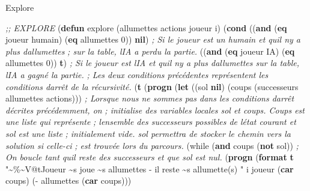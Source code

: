 \documentclass[
]{article}
\newenvironment{Shaded}{}{}
\newcommand{\CommentTok}[1]{\textcolor[rgb]{0.38,0.63,0.69}{\textit{#1}}}
\newcommand{\DecValTok}[1]{\textcolor[rgb]{0.25,0.63,0.44}{#1}}
\newcommand{\FunctionTok}[1]{\textcolor[rgb]{0.02,0.16,0.49}{#1}}
\newcommand{\KeywordTok}[1]{\textcolor[rgb]{0.00,0.44,0.13}{\textbf{#1}}}
\newcommand{\NormalTok}[1]{#1}
\newcommand{\OperatorTok}[1]{\textcolor[rgb]{0.40,0.40,0.40}{#1}}
\newcommand{\StringTok}[1]{\textcolor[rgb]{0.25,0.44,0.63}{#1}}
\begin{document}
\begin{Shaded}
    \begin{algorithm}[H]
        \caption{Explore}
\begin{Highlighting}[]
\CommentTok{;; EXPLORE }
\NormalTok{(}\KeywordTok{defun}\FunctionTok{ explore }\NormalTok{(allumettes actions joueur i)}
\NormalTok{  (}\KeywordTok{cond} 
\NormalTok{   ((}\KeywordTok{and}\NormalTok{ (}\KeywordTok{eq}\NormalTok{ joueur \textquotesingle{}humain) (}\KeywordTok{eq}\NormalTok{ allumettes }\DecValTok{0}\NormalTok{)) }\KeywordTok{nil}\NormalTok{) }
   \CommentTok{; Si le joueur est un humain et qu\textquotesingle{}il n\textquotesingle{}y a plus d\textquotesingle{}allumettes }
   \CommentTok{; sur la table, l\textquotesingle{}IA a perdu la partie.}
\NormalTok{   ((}\KeywordTok{and}\NormalTok{ (}\KeywordTok{eq}\NormalTok{ joueur \textquotesingle{}IA) (}\KeywordTok{eq}\NormalTok{ allumettes }\DecValTok{0}\NormalTok{)) }\KeywordTok{t}\NormalTok{)}
   \CommentTok{; Si le joueur est l\textquotesingle{}IA et qu\textquotesingle{}il n\textquotesingle{}y a plus d\textquotesingle{}allumettes sur la table, l\textquotesingle{}IA a gagné la partie.}
   \CommentTok{; Les deux conditions précédentes représentent les conditions d\textquotesingle{}arrêt de la récursivité.}
\NormalTok{    (}\KeywordTok{t}\NormalTok{ (}\KeywordTok{progn}                             
\NormalTok{         (}\KeywordTok{let}\NormalTok{ ((sol }\KeywordTok{nil}\NormalTok{) (coups (successeurs allumettes actions))) }
         \CommentTok{; Lorsque nous ne sommes pas dans les conditions d\textquotesingle{}arrêt décrites précédemment, on }
         \CommentTok{; initialise des variables locales sol et coups. Coups est une liste qui représente}
         \CommentTok{; l\textquotesingle{}ensemble des successeurs possibles de l\textquotesingle{}état courant et sol est une liste}
         \CommentTok{; initialement vide. sol permettra de stocker le chemin vers la solution si celle{-}ci}
         \CommentTok{; est trouvée lors du parcours. }
\NormalTok{           (while (}\KeywordTok{and}\NormalTok{ coups (}\KeywordTok{not}\NormalTok{ sol)) }
           \CommentTok{; On boucle tant qu\textquotesingle{}il reste des successeurs et que sol est nul.}
\NormalTok{             (}\KeywordTok{progn}
\NormalTok{               (}\KeywordTok{format} \KeywordTok{t} \StringTok{"\textasciitilde{}\%\textasciitilde{}V@tJoueur \textasciitilde{}s joue \textasciitilde{}s allumettes {-} il reste \textasciitilde{}s }
\StringTok{               allumette(s) "}\NormalTok{ i joueur (}\KeywordTok{car}\NormalTok{ coups) (}\OperatorTok{{-}}\NormalTok{ allumettes (}\KeywordTok{car}\NormalTok{ coups)))}

\end{Highlighting}
\end{algorithm}
\end{Shaded}
\end{document}
